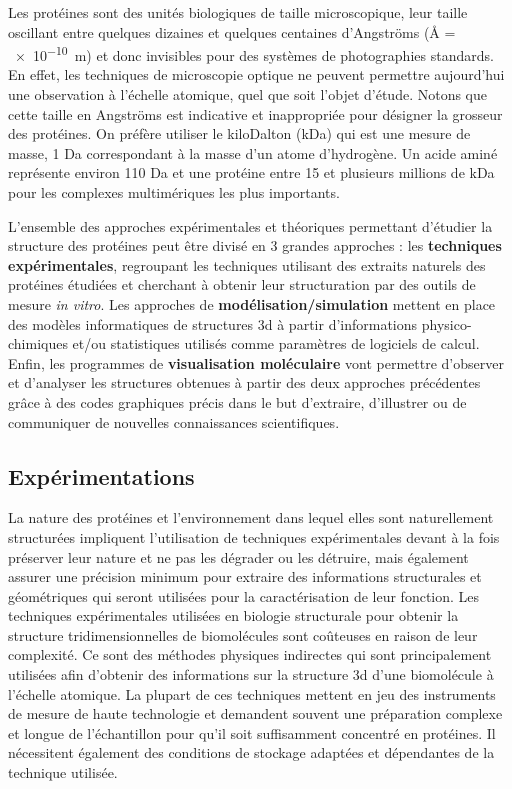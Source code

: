 Les protéines sont des unités biologiques de taille microscopique, leur taille oscillant entre quelques dizaines et quelques centaines d'Angströms (\r{A} = \SI{e-10}{\metre}) et donc invisibles pour des systèmes de photographies standards. En effet, les techniques de microscopie optique ne peuvent permettre aujourd'hui une observation à l'échelle atomique, quel que soit l'objet d'étude. Notons que cette taille en Angströms est indicative et inappropriée pour désigner la grosseur des protéines. On préfère utiliser le kiloDalton (kDa) qui est une mesure de masse, 1 Da correspondant à la masse d'un atome d'hydrogène. Un acide aminé représente environ 110 Da et une protéine entre 15 et plusieurs millions de kDa pour les complexes multimériques les plus importants.

L'ensemble des approches expérimentales et théoriques permettant d'étudier la structure des protéines peut être divisé en 3 grandes approches : les \textbf{techniques expérimentales}, regroupant les techniques utilisant des extraits naturels des protéines étudiées et cherchant à obtenir leur structuration par des outils de mesure \textit{in vitro}. Les approches de \textbf{modélisation/simulation} mettent en place des modèles informatiques de structures 3d à partir d'informations physico-chimiques et/ou statistiques utilisés comme paramètres de logiciels de calcul. Enfin, les programmes de \textbf{visualisation moléculaire} vont permettre d'observer et d'analyser les structures obtenues à partir des deux approches précédentes grâce à des codes graphiques précis dans le but d'extraire, d'illustrer ou de communiquer de nouvelles connaissances scientifiques.

\subsection{Expérimentations}

La nature des protéines et l'environnement dans lequel elles sont naturellement structurées impliquent l'utilisation de techniques expérimentales devant à la fois préserver leur nature et ne pas les dégrader ou les détruire, mais également assurer une précision minimum pour extraire des informations structurales et géométriques qui seront utilisées pour la caractérisation de leur fonction.
Les techniques expérimentales utilisées en biologie structurale pour obtenir la structure tridimensionnelles de biomolécules sont coûteuses en raison de leur complexité. Ce sont des méthodes physiques indirectes qui sont principalement utilisées afin d'obtenir des informations sur la structure 3d d'une biomolécule à l'échelle atomique. La plupart de ces techniques mettent en jeu des instruments de mesure de haute technologie et demandent souvent une préparation complexe et longue de l'échantillon pour qu'il soit suffisamment concentré en protéines. Il nécessitent également des conditions de stockage adaptées et dépendantes de la technique utilisée.

